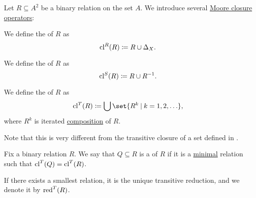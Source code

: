 \begin{definition}\label{def:relation_closures}
  Let \( R \subseteq A^2 \) be a binary relation on the set \( A \). We introduce several \hyperref[def:moore_closure_operator]{Moore closure operators}:
  \begin{thmenum}
     We define the  of \( R \) as
    \begin{equation*}
      \operatorname{cl}^R(R) \coloneqq R \cup \Delta_X.
    \end{equation*}

     We define the  of \( R \) as
    \begin{equation*}
      \operatorname{cl}^S(R) \coloneqq R \cup R^{-1}.
    \end{equation*}

     We define the  of \( R \) as
    \begin{equation*}
      \cl^T(R) \coloneqq \bigcup \set{ R^k \given k = 1, 2, \ldots },
    \end{equation*}
    where \( R^k \) is iterated \hyperref[def:binary_relation/composition]{composition} of \( R \).

    Note that this is very different from the transitive closure of a set defined in .
  \end{thmenum}
\end{definition}

\begin{definition}\label{def:transitive_reduction}
  Fix a binary relation \( R \). We say that \( Q \subseteq R \) is a  of \( R \) if it is a \hyperref[def:extremal_points/maximal_and_minimal_element]{minimal} relation such that \( \operatorname{cl}^T(Q) = \operatorname{cl}^T(R) \).

  If there exists a smallest relation, it is the unique transitive reduction, and we denote it by \( \operatorname{red}^T(R) \).
\end{definition}

